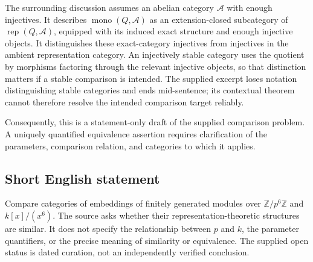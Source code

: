 \documentclass[11pt]{article}
\newcommand{\Z}{\mathbb{Z}}
\begin{document}
The surrounding discussion assumes an abelian category \(\mathcal A\) with enough injectives. It describes \(\operatorname{mono}(Q,\mathcal A)\) as an extension-closed subcategory of \(\operatorname{rep}(Q,\mathcal A)\), equipped with its induced exact structure and enough injective objects. It distinguishes these exact-category injectives from injectives in the ambient representation category. An injectively stable category uses the quotient by morphisms factoring through the relevant injective objects, so that distinction matters if a stable comparison is intended. The supplied excerpt loses notation distinguishing stable categories and ends mid-sentence; its contextual theorem cannot therefore resolve the intended comparison target reliably.

Consequently, this is a statement-only draft of the supplied comparison problem. A uniquely quantified equivalence assertion requires clarification of the parameters, comparison relation, and categories to which it applies.
\subsection{Short English statement}
Compare categories of embeddings of finitely generated modules over \(\Z/p^6\Z\) and \(k[x]/(x^6)\). The source asks whether their representation-theoretic structures are similar. It does not specify the relationship between \(p\) and \(k\), the parameter quantifiers, or the precise meaning of similarity or equivalence. The supplied open status is dated curation, not an independently verified conclusion.
\end{document}
